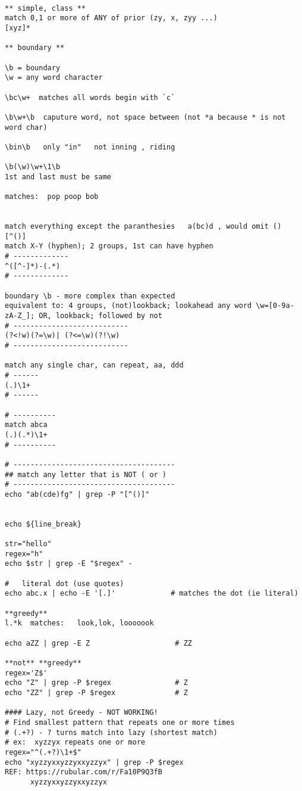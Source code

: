 \documentclass[
  letterpaper,
  DIV=11,
  numbers=noendperiod]{scrartcl}
\begin{document}
\begin{verbatim}

** simple, class **
match 0,1 or more of ANY of prior (zy, x, zyy ...)
[xyz]*    

** boundary **

\b = boundary
\w = any word character

\bc\w+  matches all words begin with `c`
 
\b\w+\b  caputure word, not space between (not *a because * is not word char)

\bin\b   only "in"   not inning , riding 

\b(\w)\w+\1\b
1st and last must be same

matches:  pop poop bob


match everything except the paranthesies   a(bc)d , would omit ()
[^()]
match X-Y (hyphen); 2 groups, 1st can have hyphen
# -------------
^([^-]*)-(.*)
# -------------

boundary \b - more complex than expected
equivalent to: 4 groups, (not)lookback; lookahead any word \w=[0-9a-zA-Z_]; OR, lookback; followed by not
# ---------------------------
(?<!w)(?=\w)| (?<=\w)(?!\w)
# ---------------------------

match any single char, can repeat, aa, ddd
# ------
(.)\1+
# ------

# ----------
match abca
(.)(.*)\1+
# ----------

# --------------------------------------
## match any letter that is NOT ( or )
# --------------------------------------
echo "ab(cde)fg" | grep -P "[^()]"


echo ${line_break}

str="hello"
regex="h"
echo $str | grep -E "$regex" -

#   literal dot (use quotes)
echo abc.x | echo -E '[.]'             # matches the dot (ie literal)

**greedy**
l.*k  matches:   look,lok, looooook

echo aZZ | grep -E Z                    # ZZ

**not** **greedy**
regex='Z$'
echo "Z" | grep -P $regex               # Z
echo "ZZ" | grep -P $regex              # Z

#### Lazy, not Greedy - NOT WORKING!    
# Find smallest pattern that repeats one or more times
# (.+?) - ? turns match into lazy (shortest match)
# ex:  xyzzyx repeats one or more
regex="^(.+?)\1+$"
echo "xyzzyxxyzzyxxyzzyx" | grep -P $regex 
REF: https://rubular.com/r/Fa10P9Q3fB
      xyzzyxxyzzyxxyzzyx


\end{verbatim}
\end{document}
